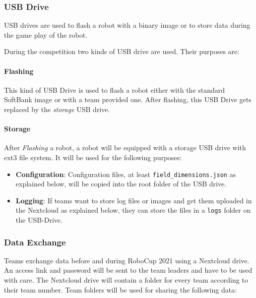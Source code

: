 \subsubsection{USB Drive}
\label{sec:c3_USB_Drive}
USB drives are used to flash a robot with a binary image or to store data during the game play of the robot.

During the competition two kinds of USB drive are used. Their purposes are:

\paragraph*{Flashing}
This kind of USB Drive is used to flash a robot either with the standard SoftBank image or with a team provided one. After flashing, this USB Drive gets replaced by the \textit{storage} USB drive.

\paragraph*{Storage}
After \textit{Flashing} a robot, a robot will be equipped with a storage USB drive with ext3 file system. It will be used for the following purposes:

\begin{itemize}
	\item \textbf{Configuration}: Configuration files, at least \texttt{field\_dimensions.json} as explained below, will be copied into the root folder of the USB drive.
	\item  \textbf{Logging}: If teams want to store log files or images and get them uploaded in the Nextcloud as explained below, they can store the files in a \texttt{logs} folder on the USB-Drive.
\end{itemize}

\subsubsection{Data Exchange}
\label{sec:data_exchange}
Teams exchange data before and during RoboCup 2021 using a Nextcloud drive. An access link and password will be sent to the team leaders and have to be used with care. The Nextcloud drive will contain a folder for every team according to their team number. Team folders will be used for sharing the following data:

